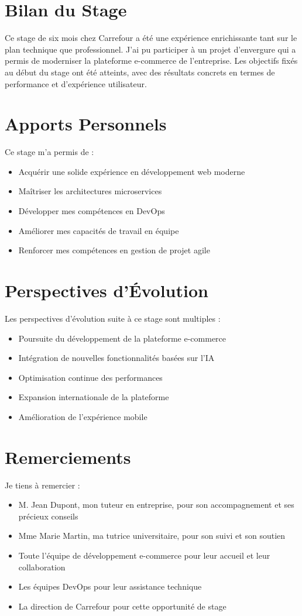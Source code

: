 \section{Bilan du Stage}
Ce stage de six mois chez Carrefour a été une expérience enrichissante tant sur le plan technique que professionnel. J'ai pu participer à un projet d'envergure qui a permis de moderniser la plateforme e-commerce de l'entreprise. Les objectifs fixés au début du stage ont été atteints, avec des résultats concrets en termes de performance et d'expérience utilisateur.

\section{Apports Personnels}
Ce stage m'a permis de :
\begin{itemize}
    \item Acquérir une solide expérience en développement web moderne
    \item Maîtriser les architectures microservices
    \item Développer mes compétences en DevOps
    \item Améliorer mes capacités de travail en équipe
    \item Renforcer mes compétences en gestion de projet agile
\end{itemize}

\section{Perspectives d'Évolution}
Les perspectives d'évolution suite à ce stage sont multiples :
\begin{itemize}
    \item Poursuite du développement de la plateforme e-commerce
    \item Intégration de nouvelles fonctionnalités basées sur l'IA
    \item Optimisation continue des performances
    \item Expansion internationale de la plateforme
    \item Amélioration de l'expérience mobile
\end{itemize}

\section{Remerciements}
Je tiens à remercier :
\begin{itemize}
    \item M. Jean Dupont, mon tuteur en entreprise, pour son accompagnement et ses précieux conseils
    \item Mme Marie Martin, ma tutrice universitaire, pour son suivi et son soutien
    \item Toute l'équipe de développement e-commerce pour leur accueil et leur collaboration
    \item Les équipes DevOps pour leur assistance technique
    \item La direction de Carrefour pour cette opportunité de stage
\end{itemize} 